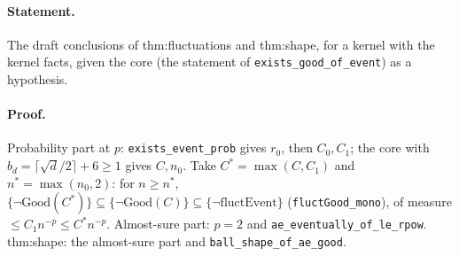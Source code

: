 \paragraph{Statement.} The draft conclusions of thm:fluctuations and thm:shape, for a kernel with the kernel facts, given the core
(the statement of \texttt{exists\_good\_of\_event}) as a hypothesis.
\paragraph{Proof.} Probability part at $p$: \texttt{exists\_event\_prob} gives $r_0$, then $C_0,C_1$; the core with $b_d=\lceil\sqrt d/2\rceil+6\geq1$ gives $C,n_0$.
Take $C^*=\max(C,C_1)$ and $n^*=\max(n_0,2)$: for $n\geq n^*$, $\{\neg\mathrm{Good}(C^*)\}\subseteq\{\neg\mathrm{Good}(C)\}\subseteq\{\neg\mathrm{fluctEvent}\}$ (\texttt{fluctGood\_mono}),
of measure $\leq C_1n^{-p}\leq C^*n^{-p}$. Almost-sure part: $p=2$ and \texttt{ae\_eventually\_of\_le\_rpow}. thm:shape: the almost-sure part and \texttt{ball\_shape\_of\_ae\_good}.
